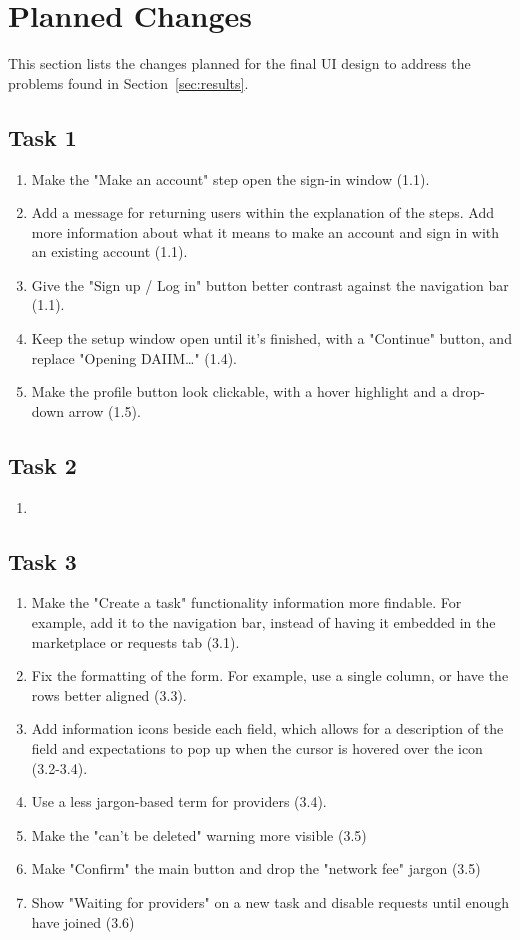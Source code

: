 \documentclass{article}
\begin{document}
\section{Planned Changes}
\label{sec:changes}
This section lists the changes planned for the final UI design to address the problems found in Section~\ref{sec:results}.

\subsection{Task 1}
\begin{enumerate}
    \item Make the "Make an account" step open the sign-in window (1.1).
    \item Add a message for returning users within the explanation of the steps. Add more information about what it means to make an account and sign in with an existing account (1.1).
    \item Give the "Sign up / Log in" button better contrast against the navigation bar (1.1).
    \item Keep the setup window open until it's finished, with a "Continue" button, and replace "Opening DAIIM…" (1.4).
    \item Make the profile button look clickable, with a hover highlight and a drop-down arrow (1.5).
\end{enumerate}

\subsection{Task 2}
\begin{enumerate}
    \item
\end{enumerate}

\subsection{Task 3}
\begin{enumerate}
    \item Make the "Create a task" functionality information more findable. For example, add it to the navigation bar, instead of having it embedded in the marketplace or requests tab (3.1).
    \item Fix the formatting of the form. For example, use a single column, or have the rows better aligned (3.3).
    \item Add information icons beside each field, which allows for a description of the field and expectations to pop up when the cursor is hovered over the icon (3.2-3.4).
    \item Use a less jargon-based term for providers (3.4).
    \item Make the "can't be deleted" warning more visible (3.5)
    \item Make "Confirm" the main button and drop the "network fee" jargon (3.5)
    \item Show "Waiting for providers" on a new task and disable requests until enough have joined (3.6)
\end{enumerate}
\end{document}
